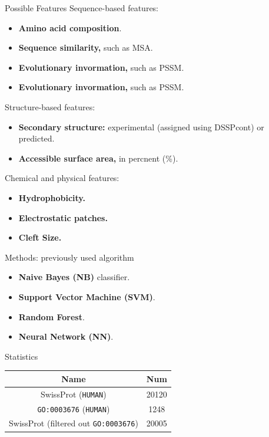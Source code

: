 \documentclass[pdf]
{beamer}
\begin{document}
\begin{frame}{Possible Features}
	Sequence-based features:
	\begin{itemize}
		\item \textbf{Amino acid composition}.
		\item \textbf{Sequence similarity,} such as MSA.
		\item \textbf{Evolutionary invormation,} such as PSSM. 
		\item \textbf{Evolutionary invormation,} such as PSSM. 
	\end{itemize}
	Structure-based features:
	\begin{itemize}
		\item \textbf{Secondary structure:} experimental (assigned using DSSPcont) or predicted.
		\item \textbf{Accessible surface area,} in percnent (\%).
	\end{itemize}
	Chemical and physical features:
	\begin{itemize}
		\item \textbf{Hydrophobicity.}
		\item \textbf{Electrostatic patches.}
		\item \textbf{Cleft Size.}
	\end{itemize}
\end{frame}

\begin{frame}{Methods: previously used algorithm}
	\begin{itemize}
		\item \textbf{Naive Bayes (NB)} classifier.
		\item \textbf{Support Vector Machine (SVM)}.
		\item \textbf{Random Forest}.
		\item \textbf{Neural Network (NN)}.
	\end{itemize}
\end{frame}

\begin{frame}{Statistics}
	\begin{tabular}{| c | c |}
		\hline
		Name & Num\\
		\hline
		SwissProt (\texttt{HUMAN}) & 20120\\
		\texttt{GO:0003676} (\texttt{HUMAN}) & 1248\\
		SwissProt (filtered out \texttt{GO:0003676}) & 20005 \\
		\hline
	\end{tabular}
\end{frame}
\end{document}
